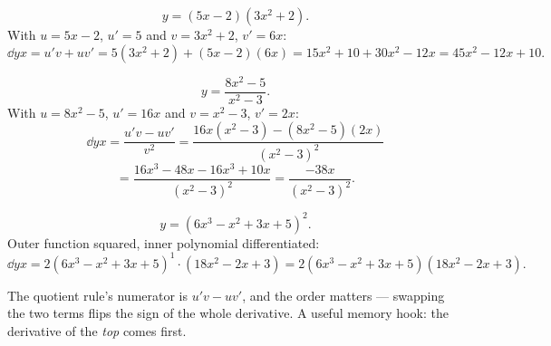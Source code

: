 \begin{solution}
\[
y=(5x-2)(3x^{2}+2).
\]
With $u=5x-2$, $u'=5$ and $v=3x^{2}+2$, $v'=6x$:
\[
\dd{y}{x}=u'v+uv'=5(3x^{2}+2)+(5x-2)(6x)
=15x^{2}+10+30x^{2}-12x=45x^{2}-12x+10 .
\]
\end{solution}

\begin{solution}
\[
y=\frac{8x^{2}-5}{x^{2}-3}.
\]
With $u=8x^{2}-5$, $u'=16x$ and $v=x^{2}-3$, $v'=2x$:
\[
\dd{y}{x}=\frac{u'v-uv'}{v^{2}}
=\frac{16x(x^{2}-3)-(8x^{2}-5)(2x)}{(x^{2}-3)^{2}}
\]
\[
=\frac{16x^{3}-48x-16x^{3}+10x}{(x^{2}-3)^{2}}
=\frac{-38x}{(x^{2}-3)^{2}} .
\]
\end{solution}

\begin{solution}
\[
y=(6x^{3}-x^{2}+3x+5)^{2}.
\]
Outer function squared, inner polynomial differentiated:
\[
\dd{y}{x}=2(6x^{3}-x^{2}+3x+5)^{1}\cdot(18x^{2}-2x+3)
=2(6x^{3}-x^{2}+3x+5)(18x^{2}-2x+3).
\]
\end{solution}

\begin{pitfall}
The quotient rule's numerator is $u'v-uv'$, and the order matters --- swapping
the two terms flips the sign of the whole derivative. A useful memory hook:
the derivative of the \emph{top} comes first.
\end{pitfall}
